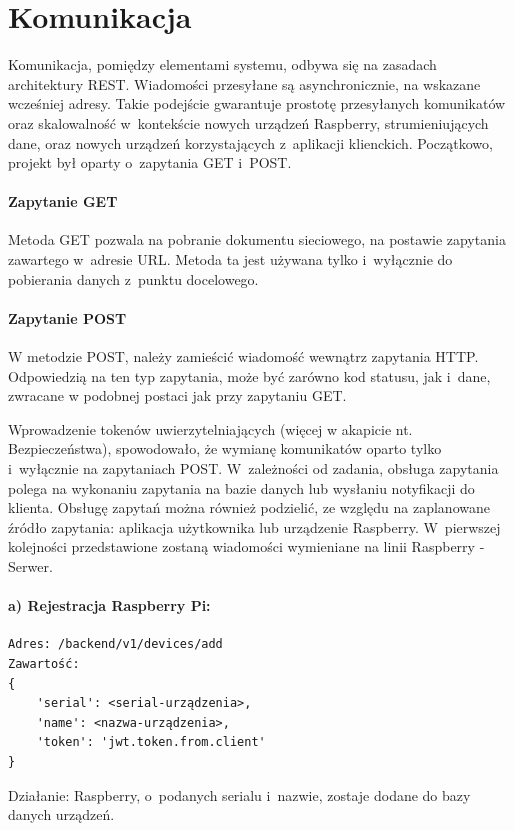 \section{Komunikacja}

Komunikacja, pomiędzy elementami systemu, odbywa się na zasadach architektury REST. Wiadomości przesyłane są asynchronicznie, na wskazane wcześniej adresy.
Takie podejście gwarantuje prostotę przesyłanych komunikatów oraz skalowalność w~kontekście nowych urządzeń Raspberry, strumieniujących dane, oraz nowych urządzeń korzystających z~aplikacji klienckich. Początkowo, projekt był oparty o~zapytania GET i~POST.  \cite{WEBARCH}

\paragraph{Zapytanie GET}
Metoda GET pozwala na pobranie dokumentu sieciowego, na postawie zapytania zawartego w~adresie URL. Metoda ta jest używana tylko i~wyłącznie do pobierania danych z~punktu docelowego. 

\paragraph{Zapytanie POST}
W metodzie POST, należy zamieścić wiadomość wewnątrz zapytania HTTP. Odpowiedzią na ten typ zapytania, może być zarówno kod statusu, jak i~dane, zwracane w podobnej postaci jak przy zapytaniu GET.

Wprowadzenie tokenów uwierzytelniających (więcej w akapicie nt. Bezpieczeństwa), spowodowało, że wymianę komunikatów oparto tylko i~wyłącznie na zapytaniach POST. 
W~zależności od zadania, obsługa zapytania polega na wykonaniu zapytania na bazie danych lub wysłaniu notyfikacji do klienta.
Obsługę zapytań można również podzielić, ze względu na zaplanowane źródło zapytania: aplikacja użytkownika lub urządzenie Raspberry.
W~pierwszej kolejności przedstawione zostaną wiadomości wymieniane na linii Raspberry - Serwer.
\paragraph{a) Rejestracja Raspberry Pi:}
\begin{verbatim}
Adres: /backend/v1/devices/add
Zawartość:
{
	'serial': <serial-urządzenia>, 
	'name': <nazwa-urządzenia>, 
	'token': 'jwt.token.from.client'
}
\end{verbatim}
Działanie: Raspberry, o~podanych serialu i~nazwie, zostaje dodane do bazy danych urządzeń.

